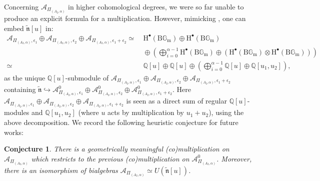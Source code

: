 \documentclass[11pt,english]{article}
\numberwithin{equation}{section}
\numberwithin{figure}{section}
\theoremstyle{definition}
\theoremstyle{plain}
\newtheorem{cj}[df]{Conjecture}
\theoremstyle{remark}
\newcommand\HH{\mathrm{H}}
\newcommand\QQ{\mathbb{Q}}
\begin{document}
Concerning $\mathcal{A}_{\Pi_{(A_{2},\alpha)}}$ in higher cohomological
degrees, we were so far unable to produce an explicit formula for
a multiplication. However, mimicking \cite{Dav22}, one can embed
$\tilde{\mathfrak{n}}[u]$ in:\[
\begin{split}
\mathcal{A}_{\Pi_{(A_2,\alpha)},\epsilon_1}\oplus\mathcal{A}_{\Pi_{(A_2,\alpha)},\epsilon_2}\oplus\mathcal{A}_{\Pi_{(A_2,\alpha)},\epsilon_1+\epsilon_2}
\simeq &
\ \HH^{\bullet}(\mathrm{B}\mathbb{G}_{\mathrm{m}})\oplus\HH^{\bullet}(\mathrm{B}\mathbb{G}_{\mathrm{m}}) \\
& \ \oplus\left(\bigoplus_{i=0}^{\alpha-1}\HH^{\bullet}(\mathrm{B}\mathbb{G}_{\mathrm{m}})\oplus\left(\HH^{\bullet}(\mathrm{B}\mathbb{G}_{\mathrm{m}})\otimes\HH^{\bullet}(\mathrm{B}\mathbb{G}_{\mathrm{m}})\right)\right) \\
\simeq & \ \QQ[u]\oplus\QQ[u]\oplus\left(\bigoplus_{i=0}^{\alpha-1}\QQ[u]\oplus\QQ[u_1,u_2]\right),
\end{split}
\]as the unique $\QQ[u]$-submodule of $\mathcal{A}_{\Pi_{(A_{2},\alpha)},\epsilon_{1}}\oplus\mathcal{A}_{\Pi_{(A_{2},\alpha)},\epsilon_{2}}\oplus\mathcal{A}_{\Pi_{(A_{2},\alpha)},\epsilon_{1}+\epsilon_{2}}$
containing $\tilde{\mathfrak{n}}\hookrightarrow\mathcal{A}_{\Pi_{(A_{2},\alpha)},\epsilon_{1}}^{0}\oplus\mathcal{A}_{\Pi_{(A_{2},\alpha)},\epsilon_{2}}^{0}\oplus\mathcal{A}_{\Pi_{(A_{2},\alpha)},\epsilon_{1}+\epsilon_{2}}^{0}$.
Here $\mathcal{A}_{\Pi_{(A_{2},\alpha)},\epsilon_{1}}\oplus\mathcal{A}_{\Pi_{(A_{2},\alpha)},\epsilon_{2}}\oplus\mathcal{A}_{\Pi_{(A_{2},\alpha)},\epsilon_{1}+\epsilon_{2}}$
is seen as a direct sum of regular $\QQ[u]$-modules and $\QQ[u_{1},u_{2}]$
(where $u$ acts by multiplication by $u_{1}+u_{2}$), using the above
decomposition. We record the following heuristic conjecture for future
works:

\begin{cj}

There is a geometrically meaningful (co)multiplication on $\mathcal{A}_{\Pi_{(A_{2},\alpha)}}$
which restricts to the previous (co)multiplication on $\mathcal{A}_{\Pi_{(A_{2},\alpha)}}^{0}$.
Moreover, there is an isomorphism of bialgebras $\mathcal{A}_{\Pi_{(A_{2},\alpha)}}\simeq U(\tilde{\mathfrak{n}}[u])$.

\end{cj}

\pagebreak{}

 \label{Section/indexNotations}


\printindex[notations]

\pagebreak{}

 \label{Section/indexTerms}


\printindex[terms]

\pagebreak{}




\pagebreak
\end{document}
